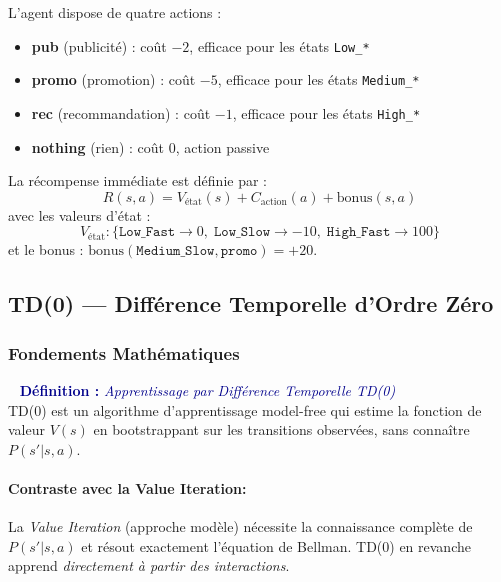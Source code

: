 \documentclass[11pt,a4paper]{article}
\newenvironment{defbox}[1]{%
  \vspace{3pt}\begin{framed}
  \noindent{\color{NavyBlue}\rule{0.3cm}{3pt}}~%
  \textcolor{DarkBlue}{\textbf{Définition :} \textit{#1}}\\[3pt]}
  {\end{framed}\vspace{3pt}}
\begin{document}
L'agent dispose de quatre actions :
\begin{itemize}
  \item \textbf{pub} (publicité) : coût $-2$, efficace pour les états \texttt{Low\_*}
  \item \textbf{promo} (promotion) : coût $-5$, efficace pour les états \texttt{Medium\_*}
  \item \textbf{rec} (recommandation) : coût $-1$, efficace pour les états \texttt{High\_*}
  \item \textbf{nothing} (rien) : coût $0$, action passive
\end{itemize}

\begin{mathBox}
La récompense immédiate est définie par :
$$R(s, a) = V_{\text{état}}(s) + C_{\text{action}}(a) + \text{bonus}(s,a)$$
avec les valeurs d'état :
$$V_{\text{état}} : \{\texttt{Low\_Fast}\to 0,\; \texttt{Low\_Slow}\to -10,\; \texttt{High\_Fast}\to 100\}$$
et le bonus : $\text{bonus}(\texttt{Medium\_Slow}, \texttt{promo}) = +20$.
\end{mathBox}

\subsection{TD(0) — Différence Temporelle d'Ordre Zéro}

\subsubsection{Fondements Mathématiques}

\begin{defbox}{Apprentissage par Différence Temporelle TD(0)}
TD(0) est un algorithme d'apprentissage model-free qui estime la fonction de valeur $V(s)$ en bootstrappant sur les transitions observées, sans connaître $P(s'|s,a)$.
\end{defbox}

\paragraph{Contraste avec la Value Iteration:}

La \emph{Value Iteration} (approche modèle) nécessite la connaissance complète de $P(s'|s,a)$ et résout exactement l'équation de Bellman. TD(0) en revanche apprend \emph{directement à partir des interactions}.
\end{document}
